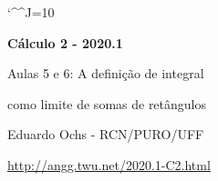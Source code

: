 \documentclass[oneside,12pt]{article}
\begin{document}
\catcode`\^^J=10


\long{}
\long{}
\long{}
\long{}
\long{}
\long{}
\long{}
\long{}
\long{}
\long{}

\long{}
\long{}

\def\frown{\ensuremath{{=}{(}}}
\def\True {\mathbf{V}}
\def\False{\mathbf{F}}
\def\Q    {\mathbb{Q}}

\def\sumiN#1{\sum_{i=1}^N #1 (b_i-a_i)}
\def\mname#1{\text{[#1]}}

\def\ointpx #1#2{\overline \int_{#1} #2 \, dx}
\def\uintpx #1#2{\underline\int_{#1} #2 \, dx}
\def\dintpx #1#2{       \ointpx{#1}{#2} - \uintpx{#1}{#2}        }
\def\pdintpx#1#2{\left( \ointpx{#1}{#2} - \uintpx{#1}{#2} \right)}

\def\drafturl{http://angg.twu.net/LATEX/2020-1-C2.pdf}
\def\drafturl{http://angg.twu.net/2020.1-C2.html}
\def\draftfooter{\tiny \href{\drafturl}{\jobname{}} \ColorBrown{\shorttoday{} \hours}}



%

\thispagestyle{empty}

\begin{center}

\vspace*{1.2cm}

{\bf \Large Cálculo 2 - 2020.1}

\bsk

Aulas 5 e 6: A definição de integral

como limite de somas de retângulos

\bsk

Eduardo Ochs - RCN/PURO/UFF

\url{http://angg.twu.net/2020.1-C2.html}

\end{center}
\end{document}
